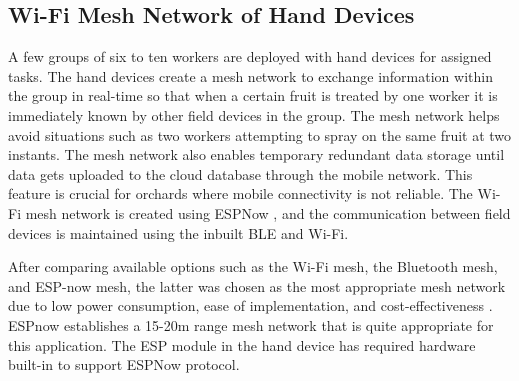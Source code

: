 \documentclass[journal]{IEEEtran}
\begin{document}
\subsection{Wi-Fi Mesh Network of Hand Devices}
A few groups of six to ten workers are deployed with hand devices for assigned tasks. The hand devices create a mesh network to exchange information within the group in real-time so that when a certain fruit is treated by one worker it is immediately known by other field devices in the group. The mesh network helps avoid situations such as two workers attempting to spray on the same fruit at two instants. The mesh network also enables temporary redundant data storage until data gets uploaded to the cloud database through the mobile network. This feature is crucial for orchards where mobile connectivity is not reliable. The Wi-Fi mesh network is created using ESPNow \cite{ESPNow}, and the communication between field devices is maintained using the inbuilt BLE and Wi-Fi.\par
After comparing available options such as the Wi-Fi mesh, the Bluetooth mesh, and ESP-now mesh, the latter was chosen as the most appropriate mesh network due to low power consumption, ease of implementation, and cost-effectiveness \cite{7566486}. ESPnow establishes a 15-20m range mesh network that is quite appropriate for this application. The ESP module in the hand device has required hardware built-in to support ESPNow protocol.
\end{document}
